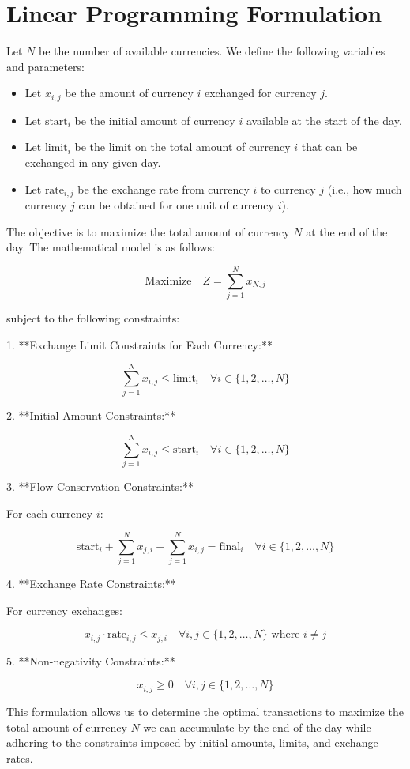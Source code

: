 \documentclass{article}
\begin{document}
\section*{Linear Programming Formulation}

Let \( N \) be the number of available currencies. We define the following variables and parameters:

\begin{itemize}
    \item Let \( x_{i,j} \) be the amount of currency \( i \) exchanged for currency \( j \).
    \item Let \( \text{start}_i \) be the initial amount of currency \( i \) available at the start of the day.
    \item Let \( \text{limit}_i \) be the limit on the total amount of currency \( i \) that can be exchanged in any given day.
    \item Let \( \text{rate}_{i,j} \) be the exchange rate from currency \( i \) to currency \( j \) (i.e., how much currency \( j \) can be obtained for one unit of currency \( i \)).
\end{itemize}

The objective is to maximize the total amount of currency \( N \) at the end of the day. The mathematical model is as follows:

\[
\text{Maximize} \quad Z = \sum_{j=1}^{N} x_{N,j}
\]

subject to the following constraints:

1. **Exchange Limit Constraints for Each Currency:**

\[
\sum_{j=1}^{N} x_{i,j} \leq \text{limit}_i \quad \forall i \in \{1, 2, \ldots, N\}
\]

2. **Initial Amount Constraints:**

\[
\sum_{j=1}^{N} x_{i,j} \leq \text{start}_i \quad \forall i \in \{1, 2, \ldots, N\}
\]

3. **Flow Conservation Constraints:**

For each currency \( i \):

\[
\text{start}_i + \sum_{j=1}^{N} x_{j,i} - \sum_{j=1}^{N} x_{i,j} = \text{final}_i \quad \forall i \in \{1, 2, \ldots, N\}
\]

4. **Exchange Rate Constraints:**

For currency exchanges:

\[
x_{i,j} \cdot \text{rate}_{i,j} \leq x_{j,i} \quad \forall i,j \in \{1, 2, \ldots, N\} \text{ where } i \neq j
\]

5. **Non-negativity Constraints:**

\[
x_{i,j} \geq 0 \quad \forall i,j \in \{1, 2, \ldots, N\}
\]

This formulation allows us to determine the optimal transactions to maximize the total amount of currency \( N \) we can accumulate by the end of the day while adhering to the constraints imposed by initial amounts, limits, and exchange rates.
\end{document}
